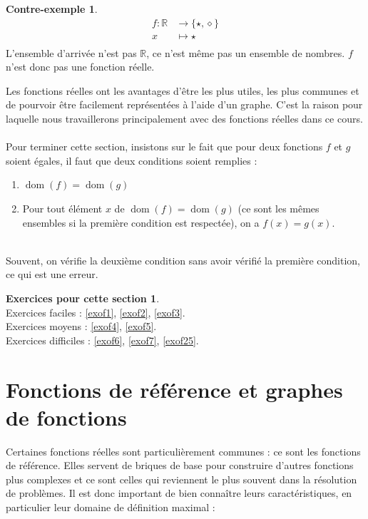 \documentclass[a4paper,13pt]{scrreprt}
\theoremstyle{plain}
\theoremstyle{definition}
\newtheorem{con}[subsection]{Contre-exemple}
\newtheorem*{epcs}{Exercices pour cette section}
\newcommand{\rr}{\mathbb{R}}
\DeclareMathOperator{\dom}{dom}
\begin{document}
\begin{con}
	\begin{align*}
	f : {\rr} &\to \{\star, \diamond\} \\
	x &\mapsto \star \\
	\end{align*}
	L'ensemble d'arrivée n'est pas $\rr$, ce n'est même pas un ensemble de nombres. $f$ n'est donc pas une fonction réelle.
\end{con}
Les fonctions réelles ont les avantages d'être les plus utiles, les plus communes et de pourvoir être facilement représentées à l'aide d'un graphe. C'est la raison pour laquelle nous travaillerons principalement avec des fonctions réelles dans ce cours. \\
~~\\
Pour terminer cette section, insistons sur le fait que pour deux fonctions $f$ et $g$ soient égales, il faut que deux conditions soient remplies : \\
\begin{enumerate}
	\item $\dom(f) = \dom(g)$ \\
	\item Pour tout élément $x$ de $\dom(f) = \dom(g)$ (ce sont les mêmes ensembles si la première condition est respectée), on a $f(x)=g(x)$.
\end{enumerate} ~\\
Souvent, on vérifie la deuxième condition sans avoir vérifié la première condition, ce qui est une erreur. \\

\begin{epcs}
	~~\\
	Exercices faciles : \ref{exof1}, \ref{exof2}, \ref{exof3}.\\
	Exercices moyens : \ref{exof4}, \ref{exof5}.\\
	Exercices difficiles : \ref{exof6}, \ref{exof7}, \ref{exof25}.
\end{epcs}


\section{Fonctions de référence et graphes de fonctions} \label{sffgf}

Certaines fonctions réelles sont particulièrement communes : ce sont les fonctions de référence. Elles servent de \og briques de base \fg{} pour construire d'autres fonctions plus complexes et ce sont celles qui reviennent le plus souvent dans la résolution de problèmes. Il est donc important de bien connaître leurs caractéristiques, en particulier leur domaine de définition maximal : \\
\end{document}
